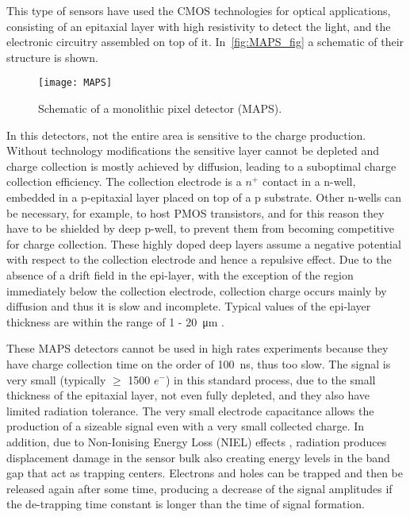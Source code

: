 This type of sensors have used the CMOS technologies for optical applications, consisting of an epitaxial layer with high resistivity to detect the light, and the electronic circuitry assembled on top of it. In~\autoref{fig:MAPS_fig} a schematic of their structure is shown. 

\begin{figure}[h!]
\centering
\texttt{[image: MAPS]}
\caption{Schematic of a monolithic pixel detector (MAPS).}
\label{fig:MAPS_fig}
\end{figure}

In this detectors, not the entire area is sensitive to the charge production. Without technology modifications the sensitive layer cannot be depleted and charge collection is mostly achieved by diffusion, leading to a suboptimal charge collection efficiency. The collection electrode is a $n^{+}$ contact in a n-well, embedded in a p-epitaxial layer placed on top of a p substrate. Other n-wells can be necessary, for example, to host PMOS transistors, and for this reason they have to be shielded by deep p-well, to prevent them from becoming competitive for charge collection. These highly doped deep layers assume a negative potential with respect to the collection electrode and hence a repulsive effect.
Due to the absence of a drift field in the epi-layer, with the exception of the region immediately below the collection electrode, collection charge occurs mainly by diffusion and thus it is slow and incomplete. 
Typical values of the epi-layer thickness are within the range of 1 - \SI{20}{\micro m} \cite{Garcia-Sciveres:2017ymt}.

These MAPS detectors cannot be used in high rates experiments because they have charge collection time on the order of \SI{100}{ns}, thus too slow. The signal is very small (typically $\geq$ 1500 $e^{-}$) in this standard process, due to the small thickness of the epitaxial layer, not even fully depleted, and they also have limited radiation tolerance. The very small electrode capacitance allows the production of a sizeable signal even with a very small collected charge.
In addition, due to Non-Ionising Energy Loss (NIEL) effects \cite{wermes_book2020}, radiation produces displacement damage in the sensor bulk also creating energy levels in the band gap that act as trapping centers. 
Electrons and holes can be trapped and then be released again after some time, producing a decrease of the signal amplitudes if the de-trapping time constant is longer than the time of signal formation. 

